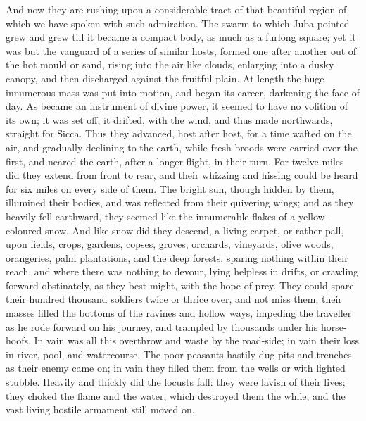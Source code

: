 And now they are rushing upon a considerable tract of that
beautiful region of which we have spoken with such admiration. The
swarm to which Juba pointed grew and grew till it became a compact
body, as much as a furlong square; yet it was but the vanguard of a
series of similar hosts, formed one after another out of the hot mould
or sand, rising into the air like clouds, enlarging into a dusky
canopy, and then discharged against the fruitful plain. At length the
huge innumerous mass was put into motion, and began its career,
darkening the face of day. As became an instrument of divine power, it
seemed to have no volition of its own; it was set off, it drifted,
with the wind, and thus made northwards, straight for Sicca. Thus they
advanced, host after host, for a time wafted on the air, and gradually
declining to the earth, while fresh broods were carried over the
first, and neared the earth, after a longer flight, in their turn. For
twelve miles did they extend from front to rear, and their
whizzing and hissing could be heard for six miles on every side of
them. The bright sun, though hidden by them, illumined their bodies,
and was reflected from their quivering wings; and as they heavily fell
earthward, they seemed like the innumerable flakes of a yellow-coloured
snow. And like snow did they descend, a living carpet, or rather pall,
upon fields, crops, gardens, copses, groves, orchards, vineyards,
olive woods, orangeries, palm plantations, and the deep forests,
sparing nothing within their reach, and where there was nothing to
devour, lying helpless in drifts, or crawling forward obstinately, as
they best might, with the hope of prey. They could spare their hundred
thousand soldiers twice or thrice over, and not miss them; their
masses filled the bottoms of the ravines and hollow ways, impeding the
traveller as he rode forward on his journey, and trampled by thousands
under his horse-hoofs. In vain was all this overthrow and waste by the
road-side; in vain their loss in river, pool, and watercourse. The
poor peasants hastily dug pits and trenches as their enemy came on; in
vain they filled them from the wells or with lighted stubble. Heavily
and thickly did the locusts fall: they were lavish of their lives;
they choked the flame and the water, which destroyed them the while,
and the vast living hostile armament still moved on.

